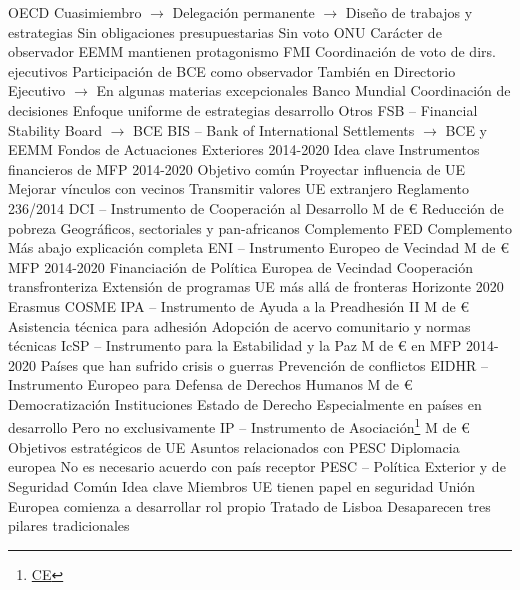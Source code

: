 \documentclass{nuevotema}
\begin{document}
\begin{esquemal}
			\3 OECD
				\4 Cuasimiembro
				\4[] $\to$ Delegación permanente
				\4[] $\to$ Diseño de trabajos y estrategias
				\4 Sin obligaciones presupuestarias
				\4 Sin voto
			\3 ONU
				\4 Carácter de observador
				\4 EEMM mantienen protagonismo
			\3 FMI
				\4 Coordinación de voto de dirs. ejecutivos
				\4 Participación de BCE como observador
				\4[] También en Directorio Ejecutivo
				\4[] $\to$ En algunas materias excepcionales
			\3 Banco Mundial
				\4 Coordinación de decisiones
				\4 Enfoque uniforme de estrategias desarrollo
			\3 Otros
				\4 FSB -- Financial Stability Board
				\4[] $\to$ BCE
				\4 BIS -- Bank of International Settlements
				\4[] $\to$ BCE y EEMM
		\2 Fondos de Actuaciones Exteriores 2014-2020
			\3 Idea clave
				\4 Instrumentos financieros de MFP 2014-2020
				\4 Objetivo común
				\4[] Proyectar influencia de UE
				\4[] Mejorar vínculos con vecinos
				\4[] Transmitir valores UE extranjero
				\4 Reglamento 236/2014
			\3 DCI -- Instrumento de Cooperación al Desarrollo
				 M de €
				\4 Reducción de pobreza
				\4 Geográficos, sectoriales y pan-africanos
				\4 Complemento FED
				\4[] Complemento
				\4 Más abajo explicación completa
			\3 ENI -- Instrumento Europeo de Vecindad
				 M de € MFP 2014-2020
				\4 Financiación de Política Europea de Vecindad
				\4 Cooperación transfronteriza
				\4 Extensión de programas UE más allá de fronteras
				\4[] Horizonte 2020
				\4[] Erasmus
				\4[] COSME
			\3 IPA -- Instrumento de Ayuda a la Preadhesión II
				\4 12.000 M de €
				\4 Asistencia técnica para adhesión
				\4 Adopción de acervo comunitario y normas técnicas
			\3 IcSP -- Instrumento para la Estabilidad y la Paz
				 M de € en MFP 2014-2020
				\4 Países que han sufrido crisis o guerras
				\4 Prevención de conflictos
			\3 EIDHR -- Instrumento Europeo para Defensa de Derechos Humanos
				\4 1.300 M de €
				\4 Democratización
				\4 Instituciones
				\4 Estado de Derecho
				\4 Especialmente en países en desarrollo
				\4[] Pero no exclusivamente
			\3 IP -- Instrumento de Asociación\footnote{\href{https://ec.europa.eu/fpi/what-we-do/partnership-instrument-advancing-eus-core-interests_en}{CE}}
				 M de €
				\4 Objetivos estratégicos de UE
				\4 Asuntos relacionados con PESC
				\4 Diplomacia europea
				\4 No es necesario acuerdo con país receptor
		\2 PESC -- Política Exterior y de Seguridad Común
			\3 Idea clave
				\4 Miembros UE tienen papel en seguridad
				\4 Unión Europea comienza a desarrollar rol propio
				\4 Tratado de Lisboa
				\4[] Desaparecen tres pilares tradicionales

\end{esquemal}
\end{document}
